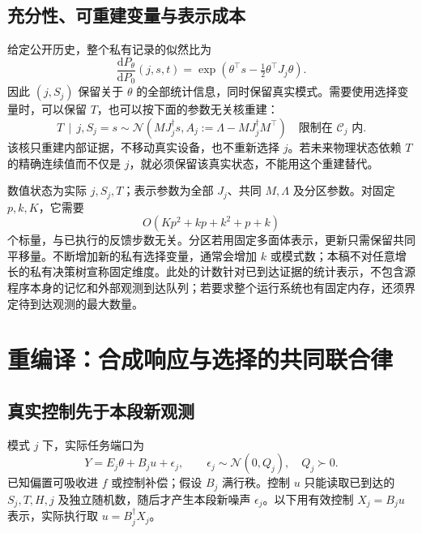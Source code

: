 \documentclass[UTF8,fontset=fandol,11pt,a4paper]{ctexart}
\newcommand{\N}{\mathcal N}
\newcommand{\given}{\,\mid\,}
\newcommand{\dd}{\mathrm d}
\theoremstyle{definition}
\theoremstyle{remark}
\numberwithin{equation}{section}
\begin{document}
\subsection{充分性、可重建变量与表示成本}
给定公开历史，整个私有记录的似然比为
\begin{equation}
 \frac{\dd P_\theta}{\dd P_0}(j,s,t)
 =\exp\!\left(\theta^\top s-\tfrac12\theta^\top J_j\theta\right).
 \label{eq:sel-likelihood}
\end{equation}
因此 $(j,S_j)$ 保留关于 $\theta$ 的全部统计信息，同时保留真实模式。需要使用选择变量时，可以保留 $T$，也可以按下面的参数无关核重建：
\begin{equation}
 T\given j,S_j=s\sim
 \N\!\left(MJ_j^\dagger s,
 A_j:=\Lambda-MJ_j^\dagger M^\top\right)
 \quad\text{限制在 }\mathcal C_j\text{ 内}.
 \label{eq:selector-bridge}
\end{equation}
该核只重建内部证据，不移动真实设备，也不重新选择 $j$。若未来物理状态依赖 $T$ 的精确连续值而不仅是 $j$，就必须保留该真实状态，不能用这个重建替代。

数值状态为实际 $j,S_j,T$；表示参数为全部 $J_j$、共同 $M,\Lambda$ 及分区参数。对固定 $p,k,K$，它需要
\begin{equation}
 O(Kp^2+kp+k^2+p+k)
 \label{eq:sel-memory}
\end{equation}
个标量，与已执行的反馈步数无关。分区若用固定多面体表示，更新只需保留共同平移量。不断增加新的私有选择变量，通常会增加 $k$ 或模式数；本稿不对任意增长的私有决策树宣称固定维度。此处的计数针对已到达证据的统计表示，不包含源程序本身的记忆和外部观测到达队列；若要求整个运行系统也有固定内存，还须界定待到达观测的最大数量。

\section{重编译：合成响应与选择的共同联合律}
\label{sec:sel-compile}

\subsection{真实控制先于本段新观测}
模式 $j$ 下，实际任务端口为
\begin{equation}
 Y=E_j\theta+B_j u+\epsilon_j,\qquad
 \epsilon_j\sim\N(0,Q_j),\quad Q_j\succ0.
 \label{eq:sel-physical}
\end{equation}
已知偏置可吸收进 $f$ 或控制补偿；假设 $B_j$ 满行秩。控制 $u$ 只能读取已到达的 $S_j,T,H,j$ 及独立随机数，随后才产生本段新噪声 $\epsilon_j$。以下用有效控制 $X_j=B_ju$ 表示，实际执行取 $u=B_j^\dagger X_j$。
\end{document}
